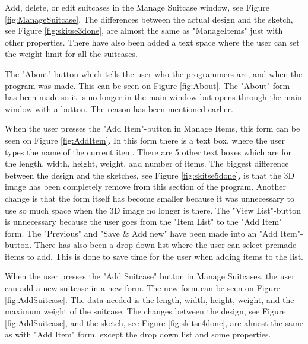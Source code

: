 Add, delete, or edit suitcases in the Manage Suitcase window, see Figure \ref{fig:ManageSuitcase}. The differences between the actual design and the sketch, see Figure \ref{fig:skitse3done}, are almost the same as "ManageItems" just with other properties. There have also been added a text space where the user can set the weight limit for all the suitcases.

The "About"-button which tells the user who the programmers are, and when the program was made. This can be seen on Figure \ref{fig:About}. The "About" form has been made so it is no longer in the main window but opens through the main window with a button. The reason has been mentioned earlier.

When the user presses the "Add Item"-button in Manage Items, this form can be seen on Figure \ref{fig:AddItem}. In this form there is a text box, where the user types the name of the current item. There are 5 other text boxes which are for the length, width, height, weight, and number of items. The biggest difference between the design and the sketches, see Figure \ref{fig:skitse5done}, is that the 3D image has been completely remove from this section of the program. Another change is that the form itself has become smaller because it was unnecessary to use so much space when the 3D image no longer is there. The "View List"-button is unnecessary because the user goes from the "Item List" to the "Add Item" form. The "Previous" and "Save \& Add new" have been made into an "Add Item"-button. There has also been a drop down list where the user can select premade items to add. This is done to save time for the user when adding items to the list.

When the user presses the "Add Suitcase" button in Manage Suitcases, the user can add a new suitcase in a new form. The new form can be seen on Figure \ref{fig:AddSuitcase}. The data needed is the length, width, height, weight, and the maximum weight of the suitcase. The changes between the design, see Figure \ref{fig:AddSuitcase}, and the sketch, see Figure \ref{fig:skitse4done}, are almost the same as with "Add Item" form, except the drop down list and some properties.

